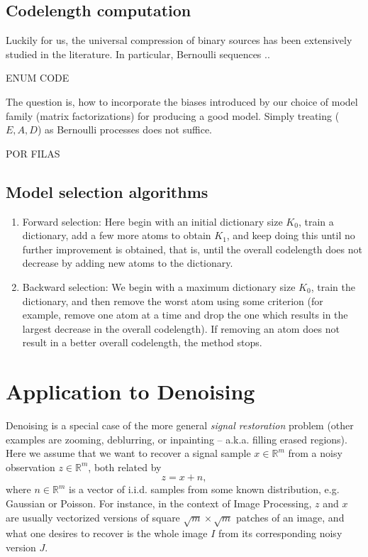 \documentclass[twocolumn]{IEEEtran}
\theoremstyle{definition}
\def\reals{\ensuremath{\mathbb{R}}}
\begin{document}
\subsection{Codelength computation}

Luckily for us, the universal compression of binary sources has been extensively studied in the literature. In particular, Bernoulli sequences ..

ENUM CODE

The question is, how to incorporate the biases introduced by our choice of model family (matrix factorizations) for producing a good model. Simply treating ($E,A,D$) as Bernoulli processes does not suffice.

POR FILAS

\subsection{Model selection algorithms}

\begin{enumerate}
\item Forward selection:  Here begin with an initial dictionary size $K_0$, train a dictionary, add a few more atoms to obtain $K_1$, and keep doing this until no further improvement is obtained, that is, until the overall codelength does not decrease by adding new atoms to the dictionary.
 
\item Backward selection: We begin with a maximum dictionary size $K_0$, train the dictionary, and then remove the worst atom using some criterion (for example, remove one atom at a time and drop the one  which results in the largest decrease in the overall codelength). If removing an atom does not result in a better overall codelength, the method stops. 
\end{enumerate}

\section{Application to Denoising}
\label{sec:denoising}

Denoising is a special case of the more general \emph{signal restoration} problem (other examples are zooming, deblurring, or inpainting -- a.k.a. filling erased regions). Here we assume that we want to recover a signal sample $x \in \reals^{m}$ from a noisy observation $z \in \reals^{m}$, both related by
\[
z = x + n,
\]
where $n \in \reals^m$ is a vector of i.i.d. samples from some known distribution, e.g. Gaussian or Poisson. For instance, in the context of Image Processing, $z$ and $x$ are usually vectorized versions of square $\sqrt{m}\times\sqrt{m}$ patches of an image, and what one desires to recover is the whole image $I$ from its corresponding noisy version $J$.
\end{document}
